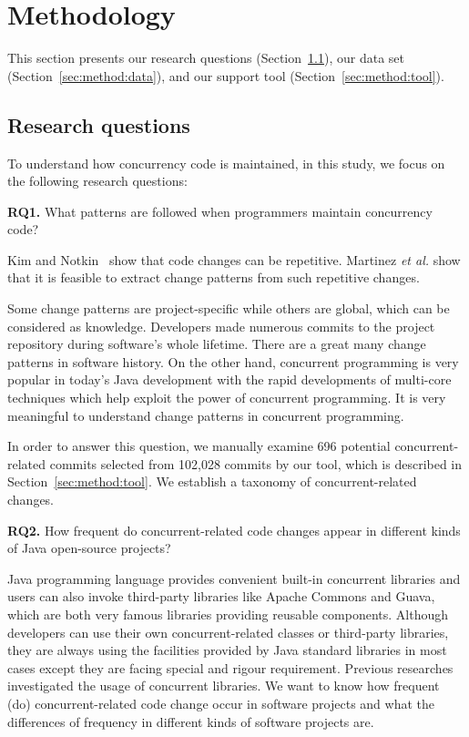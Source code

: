 \section{Methodology}
\label{sec:method}
This section presents our research questions (Section~\ref{sec:method:rq}), our data set (Section~\ref{sec:method:data}), and our support tool (Section~\ref{sec:method:tool}).
\subsection{Research questions}
\label{sec:method:rq}
To understand how concurrency code is maintained, in this study, we focus on the following research questions:

\textbf{RQ1.} What patterns are followed when programmers maintain concurrency code?

Kim and Notkin~\cite{conf/icse/KimN09} show that code changes can be repetitive. Martinez \emph{et al.}\cite{conf/icsm/MartinezDM13} show that it is feasible to extract change patterns from such repetitive changes. 

Some change patterns are project-specific while others are global, which can be considered as knowledge. Developers made numerous commits to the project repository during software's whole lifetime. There are a great many change patterns in software history. On the other hand, concurrent programming is very popular in today's Java development with the rapid developments of multi-core techniques which help exploit the power of concurrent programming. It is very meaningful to understand change patterns in concurrent programming.%

In order to answer this question, we manually examine 696 potential concurrent-related commits selected from 102,028 commits by our tool, which is described in Section~\ref{sec:method:tool}. We establish a taxonomy of concurrent-related changes.

\textbf{RQ2.} How frequent do concurrent-related code changes appear in different kinds of Java open-source projects?

Java programming language provides convenient built-in concurrent libraries and users can also invoke third-party libraries like Apache Commons and Guava, which are both very famous libraries providing reusable components. Although developers can use their own concurrent-related classes or third-party libraries, they are always using the facilities provided by Java standard libraries in most cases except they are facing special and rigour requirement. Previous researches \cite{journals/jss/PintoTFFB15, journals/infsof/WuCZX16, conf/sigsoft/OkurD12} investigated the usage of concurrent libraries. We want to know how frequent (do) concurrent-related code change occur in software projects and what the differences of frequency in different kinds of software projects are.

